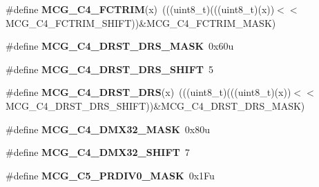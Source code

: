 \begin{DoxyCompactItemize}
\item 
\mbox{\label{group___m_c_g___register___masks_ga7ffe6f164c3d7440b9911c8de59b7171}} 
\#define {\bfseries M\+C\+G\+\_\+\+C4\+\_\+\+F\+C\+T\+R\+IM}(x)~(((uint8\+\_\+t)(((uint8\+\_\+t)(x))$<$$<$M\+C\+G\+\_\+\+C4\+\_\+\+F\+C\+T\+R\+I\+M\+\_\+\+S\+H\+I\+FT))\&M\+C\+G\+\_\+\+C4\+\_\+\+F\+C\+T\+R\+I\+M\+\_\+\+M\+A\+SK)
\item 
\mbox{\label{group___m_c_g___register___masks_ga7f6629e8d17efb2cec3d2f63d09ede5a}} 
\#define {\bfseries M\+C\+G\+\_\+\+C4\+\_\+\+D\+R\+S\+T\+\_\+\+D\+R\+S\+\_\+\+M\+A\+SK}~0x60u
\item 
\mbox{\label{group___m_c_g___register___masks_ga27d4baa0c8a770f1f67ab47e6407e948}} 
\#define {\bfseries M\+C\+G\+\_\+\+C4\+\_\+\+D\+R\+S\+T\+\_\+\+D\+R\+S\+\_\+\+S\+H\+I\+FT}~5
\item 
\mbox{\label{group___m_c_g___register___masks_gaf074d694a596e6e92614fd435c9ccb35}} 
\#define {\bfseries M\+C\+G\+\_\+\+C4\+\_\+\+D\+R\+S\+T\+\_\+\+D\+RS}(x)~(((uint8\+\_\+t)(((uint8\+\_\+t)(x))$<$$<$M\+C\+G\+\_\+\+C4\+\_\+\+D\+R\+S\+T\+\_\+\+D\+R\+S\+\_\+\+S\+H\+I\+FT))\&M\+C\+G\+\_\+\+C4\+\_\+\+D\+R\+S\+T\+\_\+\+D\+R\+S\+\_\+\+M\+A\+SK)
\item 
\mbox{\label{group___m_c_g___register___masks_ga5d16ac35cf87b3cdeeefca1c16a0eda0}} 
\#define {\bfseries M\+C\+G\+\_\+\+C4\+\_\+\+D\+M\+X32\+\_\+\+M\+A\+SK}~0x80u
\item 
\mbox{\label{group___m_c_g___register___masks_ga12d73b2d4a4fd1f2fb21a1cbe87aaa83}} 
\#define {\bfseries M\+C\+G\+\_\+\+C4\+\_\+\+D\+M\+X32\+\_\+\+S\+H\+I\+FT}~7
\item 
\mbox{\label{group___m_c_g___register___masks_ga28ab0b9007f9941707395660db088172}} 
\#define {\bfseries M\+C\+G\+\_\+\+C5\+\_\+\+P\+R\+D\+I\+V0\+\_\+\+M\+A\+SK}~0x1\+Fu
\item 
\mbox{\label{group___m_c_g___register___masks_ga452026beec3bec5a580d151e15d83f30}} 

\end{DoxyCompactItemize}
